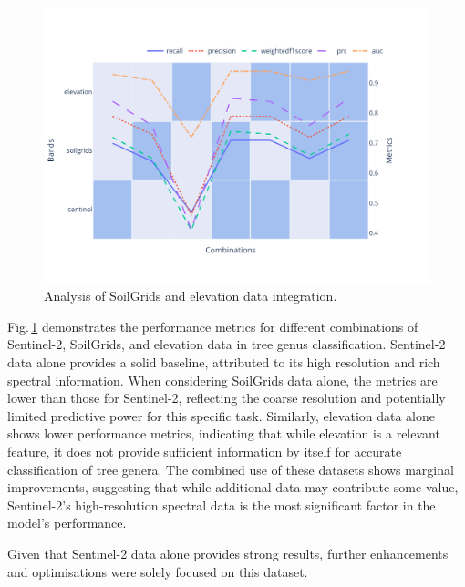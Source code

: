 \begin{figure}[ht]
    \centering
    \includegraphics[width=0.9\linewidth, trim={20pt 40pt 10pt 30pt}, clip]{figures/figures_analysis/soil_elevation_analysis.pdf}
    \caption{Analysis of SoilGrids and elevation data integration.}
    \label{fig:soil_elevation_analysis}
\end{figure}

Fig.\,\ref{fig:soil_elevation_analysis} demonstrates the performance metrics for different combinations of Sentinel-2, SoilGrids, and elevation data in tree genus classification. Sentinel-2 data alone provides a solid baseline, attributed to its high resolution and rich spectral information. When considering SoilGrids data alone, the metrics are lower than those for Sentinel-2, reflecting the coarse resolution and potentially limited predictive power for this specific task. Similarly, elevation data alone shows lower performance metrics, indicating that while elevation is a relevant feature, it does not provide sufficient information by itself for accurate classification of tree genera. The combined use of these datasets shows marginal improvements, suggesting that while additional data may contribute some value, Sentinel-2's high-resolution spectral data is the most significant factor in the model's performance.

Given that Sentinel-2 data alone provides strong results, further enhancements and optimisations were solely focused on this dataset. 